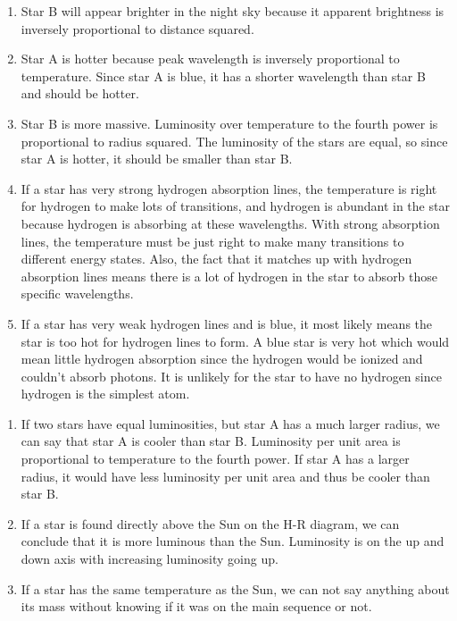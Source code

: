 \documentclass[../hw2.tex]{subfiles}
\begin{document}

    \begin{enumerate}
        \item {} Star B will appear brighter in the night sky because it apparent brightness is inversely proportional to distance squared.
        \item {} Star A is hotter because peak wavelength is inversely proportional to temperature. Since star A is blue, it has a shorter wavelength than star B and should be hotter.
        \item {} Star B is more massive. Luminosity over temperature to the fourth power is proportional to radius squared. The luminosity of the stars are equal, so since star A is hotter, it should be smaller than star B. 
        \item {} If a star has very strong hydrogen absorption lines, the temperature is right for hydrogen to make lots of transitions, and hydrogen is abundant in the star because hydrogen is absorbing at these wavelengths. With strong absorption lines, the temperature must be just right to make many transitions to different energy states. Also, the fact that it matches up with hydrogen absorption lines means there is a lot of hydrogen in the star to absorb those specific wavelengths.
        \item {} If a star has very weak hydrogen lines and is blue, it most likely means the star is too hot for hydrogen lines to form. A blue star is very hot which would mean little hydrogen absorption since the hydrogen would be ionized and couldn't absorb photons. It is unlikely for the star to have no hydrogen since hydrogen is the simplest atom. 
    \end{enumerate}
    
    \begin{enumerate}
        \item {} If two stars have equal luminosities, but star A has a much larger radius, we can say that star A is cooler than star B. Luminosity per unit area is proportional to temperature to the fourth power. If star A has a larger radius, it would have less luminosity per unit area and thus be cooler than star B.
        \item {} If a star is found directly above the Sun on the H-R diagram, we can conclude that it is more luminous than the Sun. Luminosity is on the up and down axis with increasing luminosity going up.
        \item {} If a star has the same temperature as the Sun, we can not say anything about its mass without knowing if it was on the main sequence or not.
    \end{enumerate}
    
\end{document}
